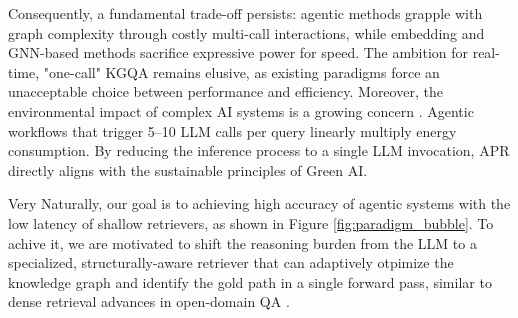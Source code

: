 \documentclass[conference]{IEEEtran}
\newcommand{\model}{\textsc{APR}}
\begin{document}
Consequently, a fundamental trade-off persists: agentic methods grapple with graph complexity through costly multi-call interactions, while embedding and GNN-based methods sacrifice expressive power for speed. The ambition for real-time, "one-call" KGQA remains elusive, as existing paradigms force an unacceptable choice between performance and efficiency. Moreover, the environmental impact of complex AI systems is a growing concern \cite{schwartz2020green, strubell2019energy}. Agentic workflows that trigger 5--10 LLM calls per query linearly multiply energy consumption. By reducing the inference process to a single LLM invocation, \model{} directly aligns with the sustainable principles of Green AI.

Very Naturally, our goal is to achieving high accuracy of agentic systems with the low latency of shallow retrievers, as shown in Figure \ref{fig:paradigm_bubble}. To achive it, we are motivated to shift the reasoning burden from the LLM to a specialized, structurally-aware retriever that can adaptively otpimize the knowledge graph and identify the gold path in a single forward pass, similar to dense retrieval advances in open-domain QA \cite{karpukhin2020dpr, khattab2020colbert}.
%
\end{document}
